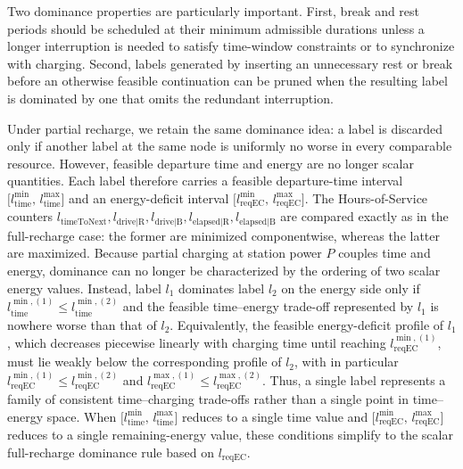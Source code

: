 \documentclass[3p,11pt,authoryear]{elsarticle}  %
\begin{document}
Two dominance properties are particularly important. First, break and rest periods should be scheduled at their minimum admissible durations unless a longer interruption is needed to satisfy time-window constraints or to synchronize with charging. Second, labels generated by inserting an unnecessary rest or break before an otherwise feasible continuation can be pruned when the resulting label is dominated by one that omits the redundant interruption. 

Under partial recharge, we retain the same dominance idea: a label is discarded only if another label at the same node is uniformly no worse in every comparable resource. However, feasible departure time and energy are no longer scalar quantities. Each label therefore carries a feasible departure-time interval \(\bigl[l_{\text{time}}^{\min},\, l_{\text{time}}^{\max}\bigr]\) and an energy-deficit interval \(\bigl[l_{\text{reqEC}}^{\min},\, l_{\text{reqEC}}^{\max}\bigr]\). The Hours-of-Service counters \(l_{\text{timeToNext}}, l_{\text{drive|R}}, l_{\text{drive|B}}, l_{\text{elapsed|R}}, l_{\text{elapsed|B}}\) 
are compared exactly as in the full-recharge case: the former are minimized componentwise, whereas the latter are maximized. Because partial charging at station power \(P\) couples time and energy, dominance can no longer be characterized by the ordering of two scalar energy values. Instead, label \(l_1\) dominates label \(l_2\) on the energy side only if \(l_{\text{time}}^{\min,(1)} \le l_{\text{time}}^{\min,(2)}\) and the feasible time--energy trade-off represented by \(l_1\) is nowhere worse than that of \(l_2\). Equivalently, the feasible energy-deficit profile of \(l_1\), which decreases piecewise linearly with charging time until reaching \(l_{\text{reqEC}}^{\min,(1)}\), must lie weakly below the corresponding profile of \(l_2\), with in particular \(l_{\text{reqEC}}^{\min,(1)} \le l_{\text{reqEC}}^{\min,(2)}\) and \(l_{\text{reqEC}}^{\max,(1)} \le l_{\text{reqEC}}^{\max,(2)}\). Thus, a single label represents a family of consistent time--charging trade-offs rather than a single point in time--energy space. When \(\bigl[l_{\text{time}}^{\min},\, l_{\text{time}}^{\max}\bigr]\) reduces to a single time value and \(\bigl[l_{\text{reqEC}}^{\min},\, l_{\text{reqEC}}^{\max}\bigr]\) reduces to a single remaining-energy value, these conditions simplify to the scalar full-recharge dominance rule based on \(l_{\text{reqEC}}\).
\end{document}
